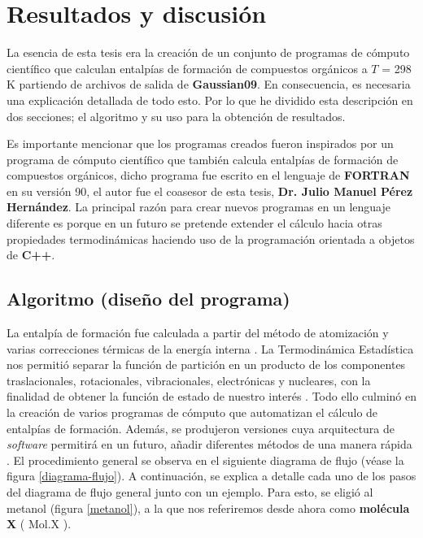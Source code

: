 \chapter{Resultados y discusión}

La esencia de esta tesis era la creación de un conjunto de programas de cómputo científico que calculan entalpías de formación de compuestos orgánicos a $T$ = 298 K partiendo de archivos de salida de \textbf{Gaussian09}. En consecuencia, es necesaria una explicación detallada de todo esto. Por lo que he dividido esta descripción en dos secciones; el algoritmo y su uso para la obtención de resultados. 

Es importante mencionar que los programas creados fueron inspirados por un programa de cómputo científico que también calcula entalpías de formación de compuestos orgánicos, dicho programa fue escrito en el lenguaje de \textbf{FORTRAN} en su versión 90, el autor fue el coasesor de esta tesis, \textbf{Dr. Julio Manuel Pérez Hernández}. La principal razón para crear nuevos programas en un lenguaje diferente es porque en un futuro se pretende extender el cálculo hacia otras propiedades termodinámicas haciendo uso de la programación orientada a objetos de \textbf{C++}. 

\section{Algoritmo (diseño del programa)}
La entalpía de formación fue calculada a partir del método de atomización \cite{Lewars2016} y varias correcciones térmicas de la energía interna \cite{Nicolaides1996}. La Termodinámica Estadística nos permitió separar la función de partición en un producto de los componentes traslacionales, rotacionales, vibracionales, electrónicas y nucleares, con la finalidad de obtener la función de estado de nuestro interés \cite{McQuarrie1976}. Todo ello culminó en la creación de varios programas de cómputo que automatizan el cálculo de entalpías de formación. Además, se produjeron versiones cuya arquitectura de \textit{software} permitirá en un futuro, añadir diferentes métodos de una manera rápida \cite{Curtiss2007, Simmie2015}. El procedimiento general se observa en el siguiente diagrama de flujo (véase la figura \ref{diagrama-flujo}). A continuación, se explica a detalle cada uno de los pasos del diagrama de flujo general junto con un ejemplo. Para esto, se eligió al metanol (figura \ref{metanol}), a la que nos referiremos desde ahora como \textbf{molécula X} ( Mol.X ).


